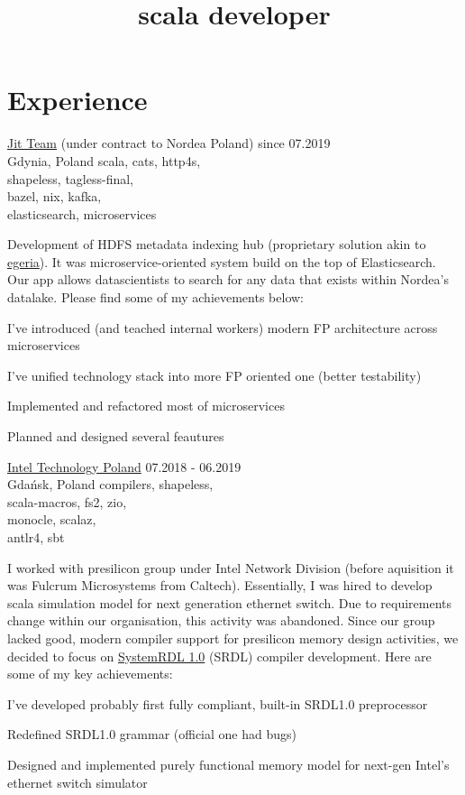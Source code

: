 \documentclass[a4paper,11pt]{cv4tw}%
\title{scala developer}
\begin{document}
\section{Experience}
      {\href{https://www.jit.team}{Jit Team} (under contract to Nordea Poland)}
      {since 07.2019\\Gdynia, Poland}
      {scala, cats, http4s,\\shapeless, tagless-final,
        \\bazel, nix, kafka,\\elasticsearch, microservices}
      {Development of HDFS metadata indexing hub (proprietary solution akin to \href{https://egeria.odpi.org}{egeria}).
        It was microservice-oriented system build on the top of Elasticsearch.
        Our app allows datascientists to search for any data that exists within Nordea's datalake.
        Please find some of my achievements below:
        \begin{missions}
        \item I've introduced (and teached internal workers) modern FP architecture across microservices
        \item I've unified technology stack into more FP oriented one (better testability)
        \item Implemented and refactored most of microservices
        \item Planned and designed several feautures
        \end{missions}
      }
      {\href{https://www.intel.com/content/www/us/en/jobs/locations/poland.html}{Intel Technology Poland}}
      {07.2018 - 06.2019\\Gdańsk, Poland}
      {compilers, shapeless,\\scala-macros, fs2, zio,\\monocle, scalaz,\\antlr4, sbt}
      {I worked with presilicon group under Intel Network Division (before aquisition it was Fulcrum Microsystems from Caltech).
        Essentially, I was hired to develop scala simulation model for next generation ethernet switch.
        Due to requirements change within our organisation, this activity was abandoned.
        Since our group lacked good, modern compiler support for presilicon memory design activities, we decided to focus on
        \href{https://www.accellera.org/downloads/standards/systemrdl}{SystemRDL 1.0} (SRDL) compiler development. Here are some of my key achievements:
        \begin{missions}
        \item I've developed probably first fully compliant, built-in SRDL1.0 preprocessor
        \item Redefined SRDL1.0 grammar (official one had bugs)
        \item Designed and implemented purely functional memory model for next-gen Intel's ethernet switch simulator
        \end{missions}
      }
\end{document}
